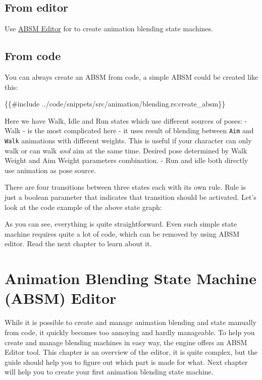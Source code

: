 \documentclass[
]{book}
\newenvironment{Shaded}{\begin{snugshade}}{\end{snugshade}}
\newcommand{\NormalTok}[1]{#1}
\theoremstyle{definition}
\theoremstyle{definition}
\theoremstyle{definition}
\theoremstyle{definition}
\theoremstyle{remark}
\begin{document}
\subsection{From editor}\label{from-editor-2}

Use \href{absm_editor.md}{ABSM Editor} for to create animation blending state machines.

\subsection{From code}\label{from-code-2}

You can always create an ABSM from code, a simple ABSM could be created like this:

\begin{Shaded}
\begin{Highlighting}[]
\NormalTok{\{\{\#include ../code/snippets/src/animation/blending.rs:create\_absm\}\}}
\end{Highlighting}
\end{Shaded}

Here we have Walk, Idle and Run states which use different sources of poses:
- Walk - is the most complicated here - it uses result of blending between \texttt{Aim} and \texttt{Walk} animations with different weights. This is useful if your character can only walk or can walk \emph{and} aim at the same time. Desired pose determined by Walk Weight and Aim Weight parameters combination.
- Run and idle both directly use animation as pose source.

There are four transitions between three states each with its own rule. Rule is just a boolean parameter that indicates that transition should be activated. Let's look at the code example of the above state graph:

As you can see, everything is quite straightforward. Even such simple state machine requires quite a lot of code, which can be removed by using ABSM editor. Read the next chapter to learn about it.

\section{Animation Blending State Machine (ABSM) Editor}\label{animation-blending-state-machine-absm-editor}

While it is possible to create and manage animation blending and state manually from code, it quickly becomes too annoying and hardly manageable. To help you create and manage blending machines in easy way, the engine offers an ABSM Editor tool. This chapter is an overview of the editor, it is quite complex, but the guide should help you to figure out which part is made for what. Next chapter will help you to create your first animation blending state machine.
\end{document}
